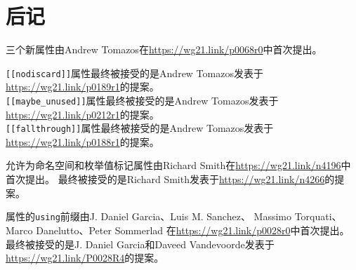 \section{后记}
三个新属性由Andrew Tomazos在\url{https://wg21.link/p0068r0}中首次提出。

\texttt{[[nodiscard]]}属性最终被接受的是Andrew Tomazos发表于
\url{https://wg21.link/p0189r1}的提案。\\
\texttt{[[maybe\_unused]]}属性最终被接受的是Andrew Tomazos发表于
\url{https://wg21.link/p0212r1}的提案。\\
\texttt{[[fallthrough]]}属性最终被接受的是Andrew Tomazos发表于
\url{https://wg21.link/p0188r1}的提案。

允许为命名空间和枚举值标记属性由Richard Smith在\url{https://wg21.link/n4196}中首次提出。
最终被接受的是Richard Smith发表于\url{https://wg21.link/n4266}的提案。

属性的\texttt{using}前缀由J. Daniel Garcia、Luis M. Sanchez、
Massimo Torquati、Marco Danelutto、Peter Sommerlad
在\url{https://wg21.link/p0028r0}中首次提出。
最终被接受的是J. Daniel Garcia和Daveed Vandevoorde发表于
\url{https://wg21.link/P0028R4}的提案。